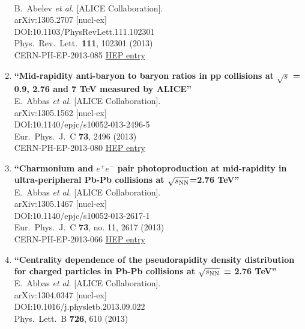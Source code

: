 \begin{enumerate}
  \\{}B.~Abelev {\it et al.} [ALICE Collaboration].
  \\{}arXiv:1305.2707 [nucl-ex]
  \\{}DOI:10.1103/PhysRevLett.111.102301
  \\{}Phys.\ Rev.\ Lett.\  {\bf 111}, 102301 (2013)
  \\{}CERN-PH-EP-2013-085
\href{http://inspirehep.net/record/1233087}{HEP entry}
\item%
{\bf ``Mid-rapidity anti-baryon to baryon ratios in pp collisions at $\sqrt{s}$ = 0.9, 2.76 and 7 TeV measured by ALICE''}
  \\{}E.~Abbas {\it et al.} [ALICE Collaboration].
  \\{}arXiv:1305.1562 [nucl-ex]
  \\{}DOI:10.1140/epjc/s10052-013-2496-5
  \\{}Eur.\ Phys.\ J.\ C {\bf 73}, 2496 (2013)
  \\{}CERN-PH-EP-2013-080
\href{http://inspirehep.net/record/1232209}{HEP entry}
\item%
{\bf ``Charmonium and $e^+e^-$ pair photoproduction at mid-rapidity in ultra-peripheral Pb-Pb collisions at $\sqrt{s_{\rm NN}}$=2.76 TeV''}
  \\{}E.~Abbas {\it et al.} [ALICE Collaboration].
  \\{}arXiv:1305.1467 [nucl-ex]
  \\{}DOI:10.1140/epjc/s10052-013-2617-1
  \\{}Eur.\ Phys.\ J.\ C {\bf 73}, no. 11, 2617 (2013)
  \\{}CERN-PH-EP-2013-066
\href{http://inspirehep.net/record/1232206}{HEP entry}
\item%
{\bf ``Centrality dependence of the pseudorapidity density distribution for \linebreak charged particles in Pb-Pb collisions at $\sqrt{s_{\rm NN}}$ = 2.76 TeV''}
  \\{}E.~Abbas {\it et al.} [ALICE Collaboration].
  \\{}arXiv:1304.0347 [nucl-ex]
  \\{}DOI:10.1016/j.physletb.2013.09.022
  \\{}Phys.\ Lett.\ B {\bf 726}, 610 (2013)

\end{enumerate}
